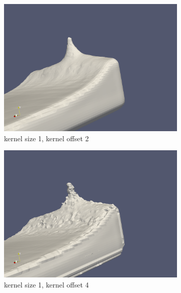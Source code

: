 \begin{figure}
\begin{subfigure}[b]{0.5\textwidth}
               \includegraphics[width=\textwidth]{figures/DBBlur_ks-1_ko-2.png}
               \caption{kernel size 1, kernel offset 2}
               \label{fig:ks1ko2}
        \end{subfigure}
        \begin{subfigure}[b]{0.5\textwidth}
               \includegraphics[width=\textwidth]{figures/DBBlur_ks-1_ko-4.png}
               \caption{kernel size 1, kernel offset 4}
               \label{fig:ks1ko4}
        \end{subfigure}
        \begin{subfigure}[b]{0.5\textwidth}

\end{subfigure}
\end{figure}
